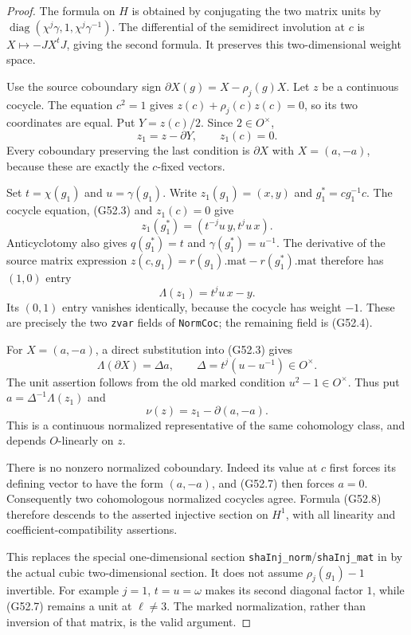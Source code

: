 \begin{proof}
The formula on $H$ is obtained by conjugating the two
matrix units by
$\operatorname{diag}(\chi^j\gamma,1,\chi^j\gamma^{-1})$.
The differential of the semidirect involution at $c$ is
$X\mapsto-JX^tJ$, giving the second formula.
It preserves this two-dimensional weight space.

Use the source coboundary sign
$\partial X(g)=X-\rho_j(g)X$.
Let $z$ be a continuous cocycle.
The equation $c^2=1$ gives
$z(c)+\rho_j(c)z(c)=0$, so its two coordinates are equal.
Put $Y=z(c)/2$.  Since $2\in O^\times$,
\[
                     z_1=z-\partial Y,
                     \qquad z_1(c)=0.                       \tag{G52.4}
\]
Every coboundary preserving the last condition is
$\partial X$ with $X=(a,-a)$, because these are exactly
the $c$-fixed vectors.

Set $t=\chi(g_1)$ and $u=\gamma(g_1)$.
Write $z_1(g_1)=(x,y)$ and
$g_1^*=cg_1^{-1}c$.
The cocycle equation, (G52.3) and $z_1(c)=0$ give
\[
                  z_1(g_1^*)=(t^{-j}u\,y,t^ju\,x).
                                                               \tag{G52.5}
\]
Anticyclotomy also gives
$q(g_1^*)=t$ and $\gamma(g_1^*)=u^{-1}$.
The derivative of the source matrix expression
$z(c,g_1)=r(g_1).\mathrm{mat}-r(g_1^*).\mathrm{mat}$
therefore has $(1,0)$ entry
\[
                         \Lambda(z_1)=t^ju\,x-y.             \tag{G52.6}
\]
Its $(0,1)$ entry vanishes identically, because the
cocycle has weight $-1$.
These are precisely the two \texttt{zvar} fields of
\texttt{NormCoc}; the remaining field is (G52.4).

For $X=(a,-a)$, a direct substitution into (G52.3) gives
\[
 \Lambda(\partial X)=\Delta a,
        \qquad\Delta=t^j(u-u^{-1})\in O^\times.              \tag{G52.7}
\]
The unit assertion follows from the old marked condition
$u^2-1\in O^\times$.
Thus put $a=\Delta^{-1}\Lambda(z_1)$ and
\[
                        \nu(z)=z_1-\partial(a,-a).           \tag{G52.8}
\]
This is a continuous normalized representative of the
same cohomology class, and depends $O$-linearly on $z$.

There is no nonzero normalized coboundary.  Indeed its
value at $c$ first forces its defining vector to have
the form $(a,-a)$, and (G52.7) then forces $a=0$.
Consequently two cohomologous normalized cocycles agree.
Formula (G52.8) therefore descends to the asserted
injective section on $H^1$, with all linearity and
coefficient-compatibility assertions.

This replaces the special one-dimensional section
\texttt{shaInj\_norm}/\texttt{shaInj\_mat} in
 by the actual
cubic two-dimensional section.
It does not assume $\rho_j(g_1)-1$ invertible.
For example $j=1$, $t=u=\omega$ makes its second
diagonal factor $1$, while (G52.7) remains a unit at
$\ell\ne3$.  The marked normalization, rather than
inversion of that matrix, is the valid argument.
\end{proof}

